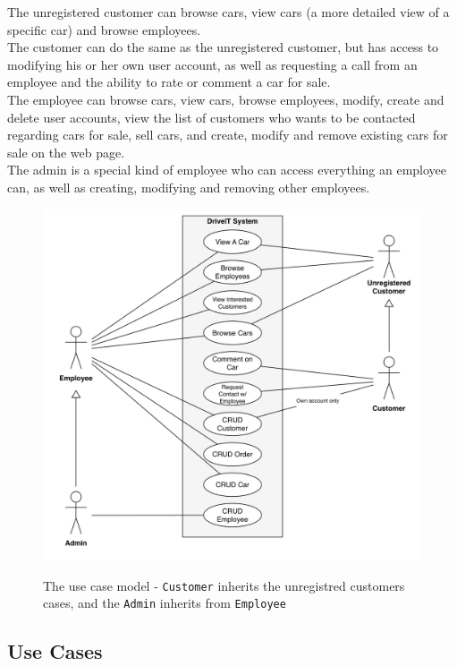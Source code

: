 The unregistered customer can browse cars, view cars (a more detailed view of a specific car) and browse employees.\\
The customer can do the same as the unregistered customer, but has access to modifying his or her own user account, as well as requesting a call from an employee and the ability to rate or comment a car for sale.\\

The employee can browse cars, view cars, browse employees, modify, create and delete user accounts, view the list of customers who wants to be contacted regarding cars for sale, sell cars, and create, modify and remove existing cars for sale on the web page.\\

The admin is a special kind of employee who can access everything an employee can, as well as creating, modifying and removing other employees.\\

\begin{figure}[h!]
    \centering
        \includegraphics[scale=0.4]{Figures/UseCase-Model}\\
    \caption{The use case model - \texttt{Customer} inherits the unregistred customers cases, and the \texttt{Admin} inherits from \texttt{Employee}}
  \label{fig:UseCaseModel}
\end{figure}
\subsection{Use Cases}










